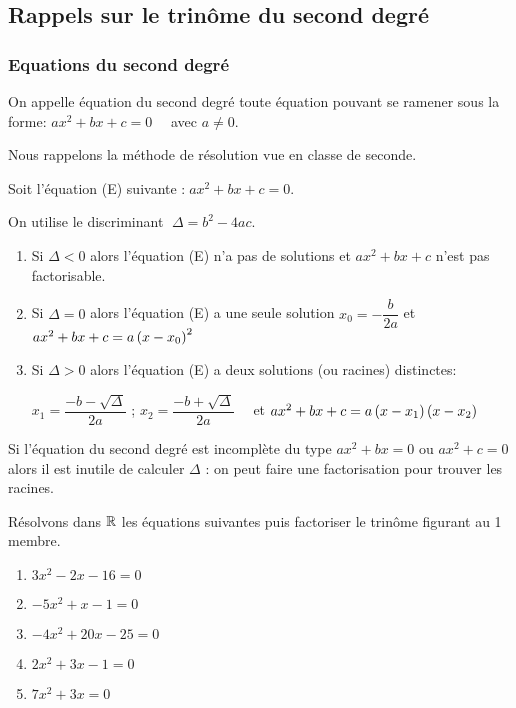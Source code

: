 


  
  \subsection{Rappels sur le trinôme du second degré}
\subsubsection*{Equations du second degré }
\begin{definition} 
 On appelle équation du second degré toute équation pouvant se ramener sous la forme: $ ax^{2}+bx+c=0  \quad $ avec  $ a\neq0 $.
\end{definition}

Nous  rappelons la méthode de résolution vue en classe de  seconde.

Soit l'équation (E) suivante :$ \; ax^{2}+bx+c=0$.

On utilise le discriminant $\; \Delta=b^{2}-4ac $.

\begin{enumerate}
\item Si $ \Delta < 0 $ alors l'équation (E) n'a  pas de  solutions et  $ ax^{2}+bx+c $ n'est pas factorisable.
   \item Si $ \Delta = 0 $ alors l'équation (E) a  une seule  solution $x_{0}=-\dfrac{b}{2a}$    et   $ ax^{2}+bx+c= a\left(x-x_{0}\right)^{2}$ 
\item Si $ \Delta > 0 $ alors l'équation (E) a deux solutions (ou racines) distinctes:


$ x_{1}=\dfrac{-b-\sqrt{\Delta}}{2a}$  ;  $x_{2}=\dfrac{-b+\sqrt{\Delta}}{2a}\quad$ et  $ ax^{2}+bx+c= a\left(x-x_{1}\right)\left(x-x_{2}\right)$ 
\end{enumerate}


\begin{remark}

 Si l'équation du  second degré est incomplète du type  $ax^{2}+bx=0 $  ou    $ ax^{2}+c=0$ alors il est inutile de calculer $ \Delta $ : on peut faire une factorisation pour trouver les racines.
\end{remark}

\begin{example}

Résolvons dans $ \mathbb{R} $  les équations suivantes puis factoriser le trinôme figurant au 1{\ier} membre.
\begin{multicols}{3}
\begin{enumerate}
\item $ 3x^{2}-2x-16=0 $
 \item $ -5x^{2}+x-1=0 $
 \item $ -4x^{2}+20x-25=0 $
   \item $ 2x^{2}+3x-1=0 $
    \item $ 7x^{2}+3x=0 $
\end{enumerate}
\end{multicols}
 \end{example}
 

